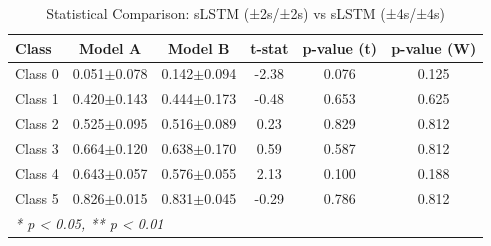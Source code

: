 \begin{table}[htbp]
\centering
\caption{Statistical Comparison: sLSTM (±2s/±2s) vs sLSTM (±4s/±4s)}
\label{tab:comparison_class_slstm_±2s_±2s_vs_slstm_±4s_±4s}
\begin{tabular}{lccccc}
\toprule
\textbf{Class} & \textbf{Model A} & \textbf{Model B} & \textbf{t-stat} & \textbf{p-value (t)} & \textbf{p-value (W)} \\
\midrule
Class 0 & 0.051$\pm$0.078 & 0.142$\pm$0.094 & -2.38 & 0.076 & 0.125 \\
Class 1 & 0.420$\pm$0.143 & 0.444$\pm$0.173 & -0.48 & 0.653 & 0.625 \\
Class 2 & 0.525$\pm$0.095 & 0.516$\pm$0.089 & 0.23 & 0.829 & 0.812 \\
Class 3 & 0.664$\pm$0.120 & 0.638$\pm$0.170 & 0.59 & 0.587 & 0.812 \\
Class 4 & 0.643$\pm$0.057 & 0.576$\pm$0.055 & 2.13 & 0.100 & 0.188 \\
Class 5 & 0.826$\pm$0.015 & 0.831$\pm$0.045 & -0.29 & 0.786 & 0.812 \\
\bottomrule
\multicolumn{6}{l}{\textit{* p < 0.05, ** p < 0.01}} \\
\end{tabular}
\end{table}